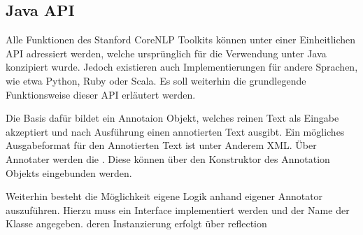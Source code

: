\subsection{Java API}
Alle Funktionen des Stanford CoreNLP Toolkits können unter einer Einheitlichen \ac{API} adressiert werden, welche ursprünglich für die Verwendung unter Java konzipiert wurde. Jedoch existieren auch Implementierungen für andere Sprachen, wie etwa Python, Ruby oder Scala. Es soll weiterhin die grundlegende Funktionsweise dieser \ac{API} erläutert werden.\par
Die Basis dafür bildet ein Annotaion Objekt, welches reinen Text als Eingabe akzeptiert und nach Ausführung einen annotierten Text ausgibt. Ein mögliches Ausgabeformat für den Annotierten Text ist unter Anderem XML. Über Annotater werden die . Diese können über den Konstruktor des Annotation Objekts eingebunden werden.\par
Weiterhin besteht die Möglichkeit eigene Logik anhand eigener Annotator auszuführen. Hierzu muss ein Interface implementiert werden und der Name der Klasse angegeben. deren Instanzierung erfolgt über reflection 

